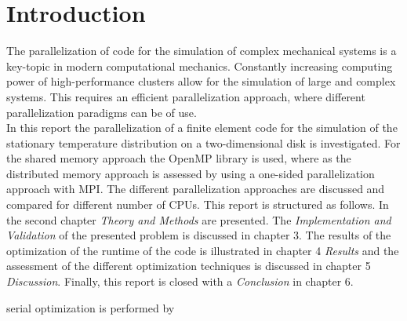 \section{Introduction}

The parallelization of code for the simulation of complex mechanical systems is a key-topic in modern computational mechanics. Constantly increasing computing power of high-performance clusters allow for the simulation of large and complex systems. This requires an efficient parallelization approach, where different parallelization paradigms can be of use. \\

In this report the parallelization of a finite element code for the simulation of the stationary temperature distribution on a two-dimensional disk is investigated. For the shared memory approach the OpenMP library is used, where as the distributed memory approach is assessed by using a one-sided parallelization approach with MPI. The different parallelization approaches are discussed and compared for different number of CPUs. This report is structured as follows. In the second chapter \textit{Theory and Methods} are presented. The \textit{Implementation and Validation} of the presented problem is discussed in chapter 3. The results of the optimization of the runtime of the code is illustrated in chapter 4 \textit{Results} and the assessment of the different optimization techniques is discussed in chapter 5 \textit{Discussion}. Finally, this report is closed with a \textit{Conclusion} in chapter 6.

serial optimization is performed by  